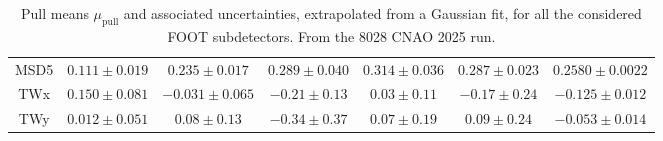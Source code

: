 \begin{table}
{\begin{tabular}{ccccccc}
			MSD5 & $0.111 \pm 0.019$ & $0.235 \pm 0.017$ & $0.289 \pm 0.040$ & $0.314 \pm 0.036$ & $0.287 \pm 0.023$ & $0.2580 \pm 0.0022$\\
			TWx  & $0.150 \pm 0.081$ & $-0.031 \pm 0.065$ & $-0.21 \pm 0.13$ & $0.03 \pm 0.11$ & $-0.17 \pm 0.24$ & $-0.125 \pm 0.012$\\
			TWy  & $0.012 \pm 0.051$ & $0.08 \pm 0.13$ & $-0.34 \pm 0.37$ & $0.07 \pm 0.19$ & $0.09 \pm 0.24$ & $-0.053 \pm 0.014$\\
			\hline
	\end{tabular}}
	\caption[Pull means for all the FOOT subdetectors]{Pull means $\mu_{\text{pull}}$ and associated uncertainties, extrapolated from a Gaussian fit, for all the considered FOOT subdetectors. From the 8028 CNAO 2025 run.}
	\label{tab:pull_all_means}
\end{table}
